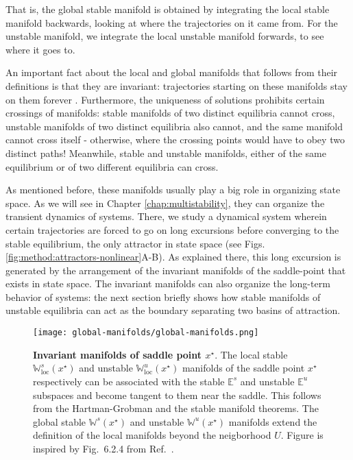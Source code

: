 That is, the global stable manifold is obtained by integrating the local stable manifold backwards, looking at where the trajectories on it came from. For the unstable manifold, we integrate the local unstable manifold forwards, to see where it goes to. 

An important fact about the local and global manifolds that follows from their definitions is that they are invariant: trajectories starting on these manifolds stay on them forever \cite{argyrisbook}.
Furthermore, the uniqueness of solutions prohibits certain crossings of manifolds: stable manifolds of two distinct equilibria cannot cross, unstable manifolds of two distinct equilibria also cannot, and the same manifold cannot cross itself - otherwise, where the crossing points would have to obey two distinct paths! Meanwhile, stable and unstable manifolds, either of the same equilibrium or of two different equilibria can cross. 

As mentioned before, these manifolds usually play a big role in organizing state space. As we will see in Chapter \ref{chap:multistability}, they can organize the transient dynamics of systems. There, we study a dynamical system wherein certain trajectories are forced to go on long excursions before converging to the stable equilibrium, the only attractor in state space (see Figs.\ref{fig:method:attractors-nonlinear}A-B). As explained there, this long excursion is generated by the arrangement of the invariant manifolds of the saddle-point that exists in state space. The invariant manifolds can also organize the long-term behavior of systems: the next section briefly shows how stable manifolds of unstable equilibria can act as the boundary separating two basins of attraction.
%
\begin{figure}
    \centering
    \texttt{[image: global-manifolds/global-manifolds.png]}
    \caption{\textbf{Invariant manifolds of saddle point $x^\star$}. The local stable $\mathbb{W}^s_\mathrm{loc}(x^\star)$ and unstable $\mathbb{W}^u_\mathrm{loc}(x^\star)$ manifolds of the saddle point $x^\star$ respectively can be associated with the stable $\mathbb{E}^s$ and unstable $\mathbb{E}^u$ subspaces and become tangent to them near the saddle. This follows from the Hartman-Grobman and the stable manifold theorems. The global stable $\mathbb{W}^s(x^\star)$ and unstable $\mathbb{W}^u(x^\star)$ manifolds extend the definition of the local manifolds beyond the neigborhood $U$.  Figure is inspired by Fig.~6.2.4 from Ref.~\cite{argyrisbook}.}
    \label{fig:method:invariantmanifolds}
\end{figure}

